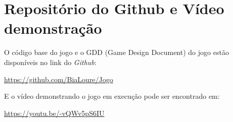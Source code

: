 \section{Repositório do Github e Vídeo demonstração}

O código base do jogo e o GDD (Game Design Document) do jogo estão disponíveis no link do \textit{ Github}:

\url{https://github.com/BiaLoure/Jogo}	

E o vídeo demonstrando o jogo em execução pode ser encontrado em:

\url{https://youtu.be/-vQWv5pS6IU}	


%
%
%
